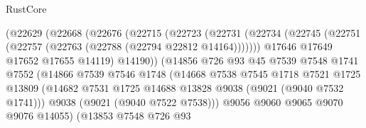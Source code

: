 \begin{lexlean}{RustCore}
\begin{coremodule}
                              (@22629
                                (@22668
                                  (@22676
                                    (@22715
                                      (@22723
                                        (@22731
                                          (@22734
                                            (@22745
                                              (@22751
                                                (@22757 (@22763 (@22788 (@22794 @22812 @14164)))))))
                                          @17646
                                          @17649
                                          @17652
                                          @17655
                                          @14119)
                                        @14190))
                                    (@14856
                                      @726
                                      @93
                                      @45
                                      @7539
                                      @7548
                                      @1741
                                      @7552
                                      (@14866
                                        @7539
                                        @7546
                                        @1748
                                        (@14668
                                          @7538
                                          @7545
                                          @1718
                                          @7521
                                          @1725
                                          @13809
                                          (@14682
                                            @7531
                                            @1725
                                            @14688
                                            @13828
                                            @9038
                                            (@9021 (@9040 @7532 @1741)))
                                          @9038
                                          (@9021 (@9040 @7522 @7538)))
                                        @9056
                                        @9060
                                        @9065
                                        @9070
                                        @9076
                                        @14055)
                                      (@13853
                                        @7548
                                        @726
                                        @93

\end{coremodule}
\end{lexlean}
